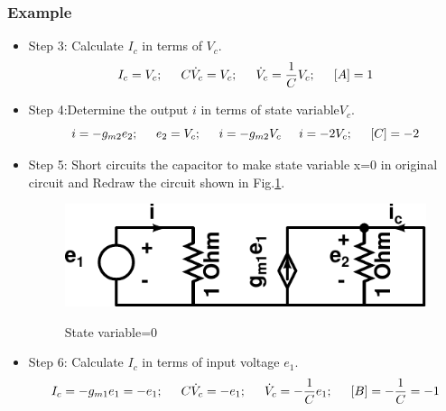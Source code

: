 \documentclass{beamer}
\begin{document}
\begin{frame}
\frametitle{Example}

\begin{small}
        \begin{itemize}
	\item Step 3: Calculate $ I_c$ in terms of $V_c$. 
\begin{equation}
I_c=V_c; \hspace{0.2in} C\dot{V}_c=V_c;\hspace{0.2in}\dot{V}_c=\frac{1}{C}V_c;\hspace{0.2in} [A]=1
\end{equation}
         \item Step 4:Determine the output $i$ in terms of state variable$V_c$.
\begin{equation}
i=-g_{m2}e_2; \hspace{0.2in}e_2=V_c; \hspace{0.2in} i=-g_{m2}V_c \hspace{0.2in} i=-2V_c;\hspace{0.2in}[C]=-2
\end{equation}
\item Step 5: Short circuits the capacitor to make state variable x=0 in original circuit and Redraw the circuit shown in Fig.\ref{ex3c}.

\begin{figure}[h!]
\centering
{\label{method}\includegraphics[totalheight=.2\textheight,width=.6\textwidth]{images/ex3c}}
\caption{State variable=0}
\label{ex3c}
\end{figure}

\item Step 6: Calculate $I_c$ in terms of input voltage $e_1$.
\begin{equation}
I_c=-g_{m1}e_1=-e_1; \hspace{0.2in}C\dot{V}_c =-e_1;\hspace{0.2in} \dot{V}_c =-\frac{1}{C}e_1;\hspace{0.2in}[B]=-\frac{1}{C}=-1
\end{equation}
         \end{itemize}
\end{small}
\end{frame}
\end{document}
